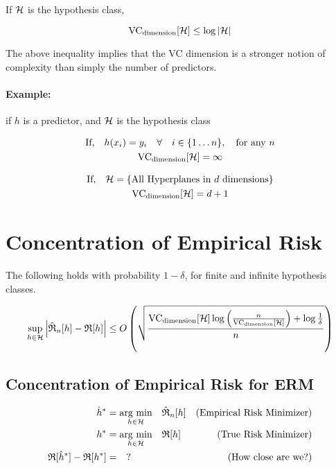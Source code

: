 \documentclass[12pt]{report}
\begin{document}
If $\mathcal H$ is the hypothesis class,

\begin{equation} \label{vc_dimension_bound}
\text{VC}_\text{dimension}[\mathcal H] \leq \log |\mathcal H|
\end{equation}

The above inequality implies that the VC dimension is a stronger notion of complexity than simply the number of predictors.

\paragraph{Example:} if $h$ is a predictor, and $\mathcal H$ is the hypothesis class

\begin{gather*}
\text{If,} \quad h(x_i) = y_i \quad \forall \quad i \in \{1 \dots n\}, \quad \text{for any $n$} \\
\text{VC}_\text{dimension}[\mathcal H] = \infty
\end{gather*}

\begin{gather*}
\text{If,} \quad \mathcal H = \{ \text{All Hyperplanes in $d$ dimensions} \} \\
\text{VC}_\text{dimension}[\mathcal H] = d + 1
\end{gather*}

\section{Concentration of Empirical Risk}

The following holds with probability $1 - \delta$, for finite and infinite hypothesis classes.

\begin{equation}
\underset{h \in \mathcal H}{\sup} \left| \hat{\mathfrak R}_n[h] - \mathfrak R[h] \right| \le O\left( \sqrt{\frac{\text{VC}_\text{dimension}[\mathcal H] \log\left(\frac{n}{\text{VC}_\text{dimension}[\mathcal H]}\right) + \log \frac{1}{\delta} }{ n }} \right)
\end{equation}

\subsection{Concentration of Empirical Risk for ERM}

\begin{align}
\hat{h}^* & = \underset{h \in \mathcal H}{\text{arg min}}\quad \hat{\mathfrak R}_n[h] & \text{(Empirical Risk Minimizer)} \\
h^* & = \underset{h \in \mathcal H}{\text{arg min}}\quad \mathfrak R[h] & \text{(True Risk Minimizer)} \\
\mathfrak R[\hat{h}^*] - \mathfrak R[h^*] & = \quad ? & \text{(How close are we?)}
\end{align}
\end{document}
